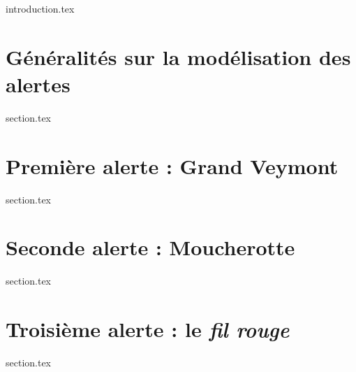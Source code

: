 
\chaptertoc{}

{introduction.tex}

\section{Généralités sur la modélisation des alertes}
\label{sec:9-1}
{section.tex}

\section{Première alerte : Grand Veymont}
\label{sec:9-2}
{section.tex}

\section{Seconde alerte : Moucherotte}
\label{sec:9-3}
{section.tex}

\section{Troisième alerte : le \emph{fil rouge}}
\label{sec:9-4}
{section.tex}


